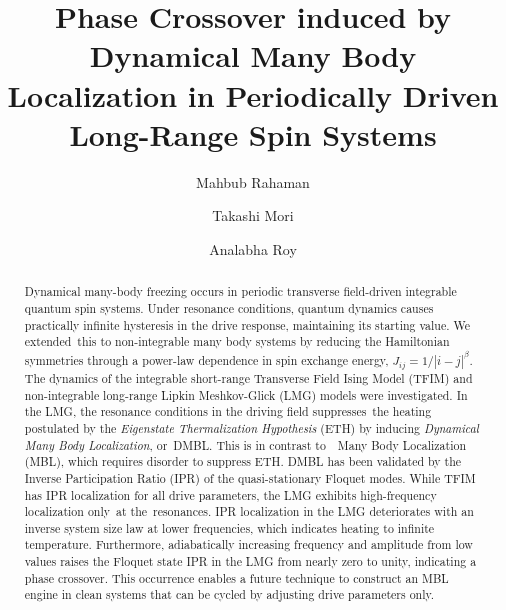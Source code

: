 \documentclass[%
reprint,
superscriptaddress,
linenumbers,
amsmath,amssymb,
aps,
prb,
showkeys,
]{revtex4-2}
\begin{document}
	
	
	\title{Phase Crossover induced by Dynamical Many Body Localization in Periodically Driven Long-Range Spin Systems}
	
	\author{Mahbub Rahaman}
	\author{Takashi Mori}
	\author{Analabha Roy}
	
	\begin{abstract}
		Dynamical many-body freezing occurs in periodic transverse field-driven integrable quantum spin systems. Under resonance conditions, quantum dynamics causes practically infinite hysteresis in the drive response, maintaining its starting value. We extended this to non-integrable many body systems by reducing the Hamiltonian symmetries through a power-law dependence in spin exchange energy, $J_{ij} = 1/|i-j|^{\beta}$. The dynamics of the integrable short-range Transverse Field Ising Model (TFIM) and non-integrable long-range Lipkin Meshkov-Glick (LMG) models were investigated. In the LMG, the resonance conditions in the driving field suppresses the heating postulated by the \textit{Eigenstate Thermalization Hypothesis} (ETH)		
		by inducing \textit{Dynamical Many Body Localization}, or DMBL. This is in contrast to  Many Body Localization (MBL), which requires disorder to suppress ETH. DMBL has been validated by the Inverse Participation Ratio (IPR) of the quasi-stationary Floquet modes. While TFIM has IPR localization for all drive parameters, the LMG exhibits high-frequency localization only at the resonances. IPR localization in the LMG deteriorates with an inverse system size law at lower frequencies, which indicates heating to infinite temperature. Furthermore, adiabatically increasing frequency and amplitude from low values raises the Floquet state IPR in the LMG from nearly zero to unity, indicating a phase crossover. This occurrence enables a future technique to construct an MBL engine in clean systems that can be cycled by adjusting drive parameters only.
	\end{abstract}
	
	\maketitle
	
\end{document}
